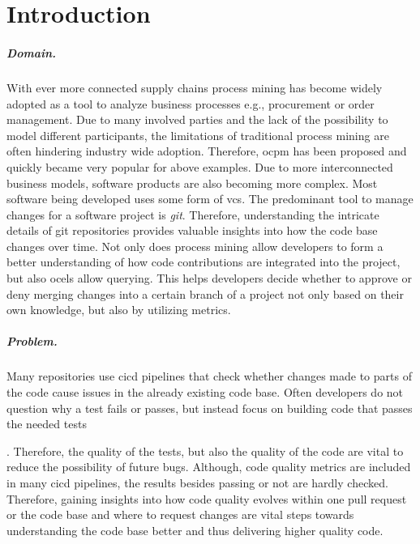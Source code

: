 \chapter{Introduction}
\label{chap:intro}

\paragraph{Domain.} With ever more connected supply chains process mining has become widely adopted as a tool to analyze business processes e.g., procurement or order management. Due to many involved parties and the lack of the possibility to model different participants, the limitations of traditional process mining are often hindering industry wide adoption. Therefore, \ac{ocpm} has been proposed and quickly became very popular for above examples. Due to more interconnected business models,  software products are also becoming more complex. Most software being developed uses some form of \ac{vcs}. The predominant tool to manage changes for a software project is \emph{git}. Therefore, understanding the intricate details of git repositories provides valuable insights into how the code base changes over time. Not only does process mining allow developers to form a better understanding of how code contributions are integrated into the project, but also \acp{ocel}  allow querying. This helps developers decide whether to approve or deny merging changes into a certain branch of a project not only based on their own knowledge, but also by utilizing metrics. 
	
\paragraph{Problem.} Many repositories use \ac{cicd} pipelines that check whether changes made to parts of the code cause issues in the already existing code base. Often developers do not question why a test fails or passes, but instead focus on building code that passes the needed tests \author{...}. Therefore, the quality of the tests, but also the quality of the code are vital to reduce the possibility of future bugs. Although, code quality metrics are included in many \ac{cicd} pipelines, the results besides passing or not are hardly checked. Therefore, gaining insights into how code quality evolves within one pull request or the code base and where to request changes are vital steps towards understanding the code base better and thus delivering higher quality code.

